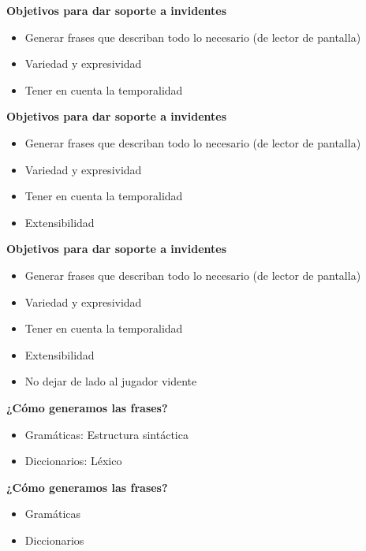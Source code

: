 \begin{tframe}{\textbf{Objetivos para dar soporte a invidentes}}
	\begin{itemize}
		\item Generar frases que describan todo lo necesario (de lector de pantalla)
		\item Variedad y expresividad
		\item<+-| alert@+> Tener en cuenta la temporalidad
	\end{itemize}
\end{tframe}

\begin{tframe}{\textbf{Objetivos para dar soporte a invidentes}}
	\begin{itemize}
		\item Generar frases que describan todo lo necesario (de lector de pantalla)
		\item Variedad y expresividad
		\item Tener en cuenta la temporalidad
		\item<+-| alert@+> Extensibilidad
	\end{itemize}
\end{tframe}

\begin{tframe}{\textbf{Objetivos para dar soporte a invidentes}}
	\begin{itemize}
		\item Generar frases que describan todo lo necesario (de lector de pantalla)
		\item Variedad y expresividad
		\item Tener en cuenta la temporalidad
		\item Extensibilidad
		\item<+-| alert@+> No dejar de lado al jugador vidente
	\end{itemize}
\end{tframe}


\begin{tframe}{\textbf{¿Cómo generamos las frases?}}
	\begin{itemize}
		\item Gramáticas: Estructura sintáctica
		\item Diccionarios: Léxico
	\end{itemize}
\end{tframe}

\begin{tframe}{\textbf{¿Cómo generamos las frases?}}
	\begin{itemize}
		\item<+-| alert@+> Gramáticas
		\item Diccionarios
	\end{itemize}
\end{tframe}

